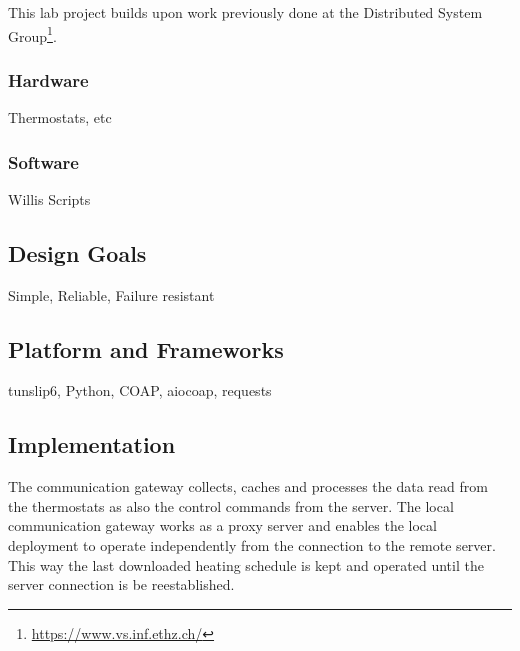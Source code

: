 This lab project builds upon work previously done at the Distributed System Group\footnote{\url{https://www.vs.inf.ethz.ch/}}. 

\subsubsection*{Hardware}

Thermostats, etc

\subsubsection*{Software}

Willis Scripts

\subsection{Design Goals}

Simple, Reliable, Failure resistant

\subsection{Platform and Frameworks}

tunslip6, Python, COAP, aiocoap, requests

\subsection{Implementation}

The communication gateway collects, caches and processes the data read from the thermostats as also the control commands from the server. The local communication gateway works as a proxy server and enables the local deployment to operate independently from the connection to the remote server. This way the last downloaded heating schedule is kept and operated until the server connection is be reestablished. 


